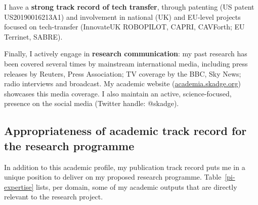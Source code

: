 I have a \textbf{strong track record of tech transfer}, through patenting (US patent
US20190016213A1) and involvement in national (UK) and EU-level projects focused on
tech-transfer (InnovateUK ROBOPILOT, CAPRI, CAVForth; EU Terrinet, SABRE).

Finally, I actively engage in \textbf{research communication}: my past research has been
covered several times by mainstream international media, including press
releases by Reuters, Press Association; TV coverage by the BBC, Sky News; radio
interviews and broadcast. My academic website (\url{academia.skadge.org})
showcases this media coverage. I also maintain an active, science-focused,
presence on the social media (Twitter handle: @skadge).


\subsection{Appropriateness of academic track record for the research programme}

In addition to this academic profile, my publication track record puts me in a
unique position to deliver on my proposed research programme.
Table~\ref{pi-expertise} lists, per domain, some of my academic outputs that are
directly relevant to the research project.

